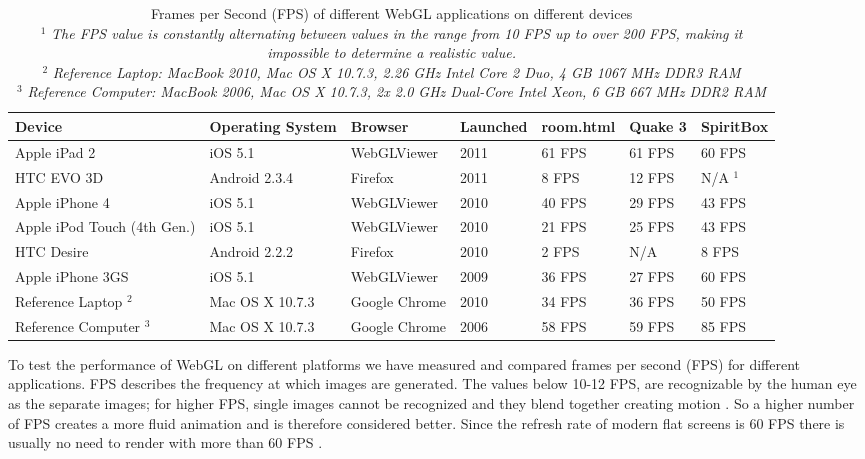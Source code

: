 \documentclass[12pt,journal,compsoc]{IEEEtran}
\begin{document}
\begin{table}[tb]
	\begin{centering}
	\begin{tabular}{l|l|l|l|l|l|l}
		\textbf{Device}	& \textbf{Operating System}	& \textbf{Browser}	& \textbf{Launched}	& \textbf{room.html}	& \textbf{Quake 3}	&	\textbf{SpiritBox}	\\
		\hline
		Apple iPad 2				& iOS 5.1			& WebGLViewer	& 2011		& 61 FPS	& 61 FPS	& 60 FPS		\\ 
		HTC EVO 3D					& Android 2.3.4		& Firefox		& 2011		& 8 FPS		& 12 FPS	& N/A $^{1}$	\\ 
		Apple iPhone 4				& iOS 5.1			& WebGLViewer	& 2010		& 40 FPS	& 29 FPS	& 43 FPS		\\
		Apple iPod Touch (4th Gen.)	& iOS 5.1			& WebGLViewer	& 2010		& 21 FPS	& 25 FPS	& 43 FPS		\\ 
		HTC Desire					& Android 2.2.2		& Firefox		& 2010		& 2 FPS 	& N/A		& 8 FPS			\\ %
		Apple iPhone 3GS			& iOS 5.1			& WebGLViewer	& 2009		&	36 FPS		&	27 FPS	&	60 FPS			\\
		\hline
		Reference Laptop $^{2}$			& 	Mac OS X 10.7.3			& 	Google Chrome	&	2010	&	34 FPS	&	36 FPS	&		50 FPS	\\
		Reference Computer $^{3}$		& 	Mac OS X 10.7.3			& 	Google Chrome	&	2006	&	58 FPS	&	59 FPS	&		85 FPS	\\
	\end{tabular}
	\caption{Frames per Second (FPS) of different WebGL applications on different devices\label{fpsTable}
	\\$^{1}$ \textit{The FPS value is constantly alternating between values in the range from 10 FPS up to over 200 FPS, making it impossible to determine a realistic value.}
	\\$^{2}$ \textit{Reference Laptop: MacBook 2010, Mac OS X 10.7.3, 2.26 GHz Intel Core 2 Duo, 4 GB 1067 MHz DDR3 RAM}
	\\$^{3}$ \textit{Reference Computer: MacBook 2006, Mac OS X 10.7.3, 2x 2.0 GHz Dual-Core Intel Xeon, 6 GB 667 MHz DDR2 RAM}}
	\end{centering}
\end{table}

To test the performance of WebGL on different platforms we have measured and compared frames per second (FPS) for different applications. FPS describes the frequency at which images are generated. The values below 10-12 FPS, are recognizable by the human eye as the separate images; for higher FPS, single images cannot be recognized and they blend together creating motion \cite{12FPS}. So a higher number of FPS creates a more fluid animation and is therefore considered better. Since the refresh rate of modern flat screens is 60 FPS there is usually no need to render with more than 60 FPS \cite{60fps}.
\end{document}
